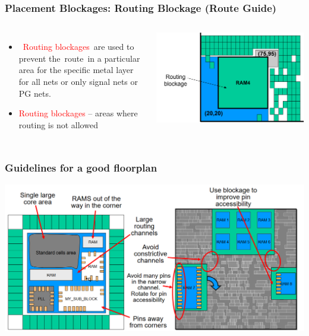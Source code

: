 \documentclass[compress]{beamer}
\begin{document}
\begin{frame}
	\frametitle{Placement Blockages: Routing Blockage (Route Guide)}
		\begin{columns}	
			\begin{itemize}
				\item  \textcolor{red}{Routing blockages} are used to prevent the route in a particular area for the specific metal layer for all nets or only signal nets or PG nets.
				\item \textcolor{red}{Routing blockages} – areas where routing is not allowed
			\end{itemize}
			\begin{center}
				\includegraphics[width= \textwidth]{RoutingBlockage}
			\end{center}
		\end{columns}
\end{frame}
\begin{frame}
	\frametitle{Guidelines for a good floorplan}
	\begin{center}
		\includegraphics[width=\textwidth]{Macro3}
	\end{center}
\end{frame}
\end{document}
